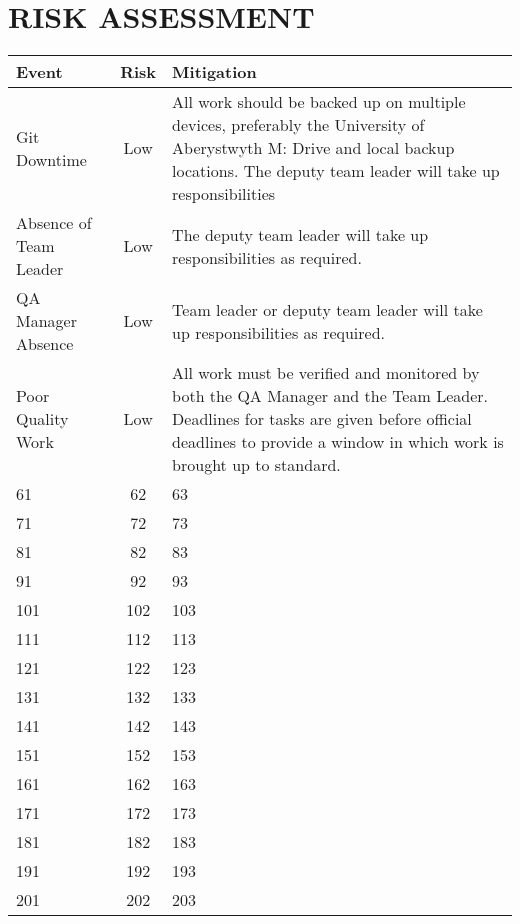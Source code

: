 \documentclass[12pt]{article}
\begin{document}
\section{RISK ASSESSMENT}
\begin{tabular}{|p{2cm}|c| p{10cm}|}
\hline
	Event  & Risk  & Mitigation \\
\hline
	Git Downtime  & Low & All work should be backed up on multiple devices, preferably the University of Aberystwyth M: Drive and local backup locations.
The deputy team leader will take up responsibilities
\\
\hline
	Absence of Team Leader & Low 
 & The deputy team leader will take up responsibilities as required.
\\
\hline
	QA Manager 
Absence 
 &Low 
 & Team leader or deputy team leader will take up responsibilities as required.
\\
\hline
	Poor Quality 
Work 
 & Low 
 & All work must be verified and monitored by both the QA Manager and the
Team Leader. Deadlines for tasks are given before official deadlines to provide
a window in which work is brought up to standard.
\\
\hline
	61 & 62 & 63\\
\hline
	71 & 72 & 73\\
\hline
	81 & 82 & 83\\
\hline
	91 & 92 & 93\\
\hline
	101 & 102 & 103\\
\hline
	111 & 112 & 113\\
\hline
	121 & 122 & 123\\
\hline
	131 & 132 & 133\\
\hline
	141 & 142 & 143\\
\hline
	151 & 152 & 153\\
\hline
	161 & 162 & 163\\
\hline
	171 & 172 & 173\\
\hline
	181 & 182 & 183\\
\hline
	191 & 192 & 193\\
\hline
	201 & 202 & 203\\
\hline
\end{tabular}
\end{document}
